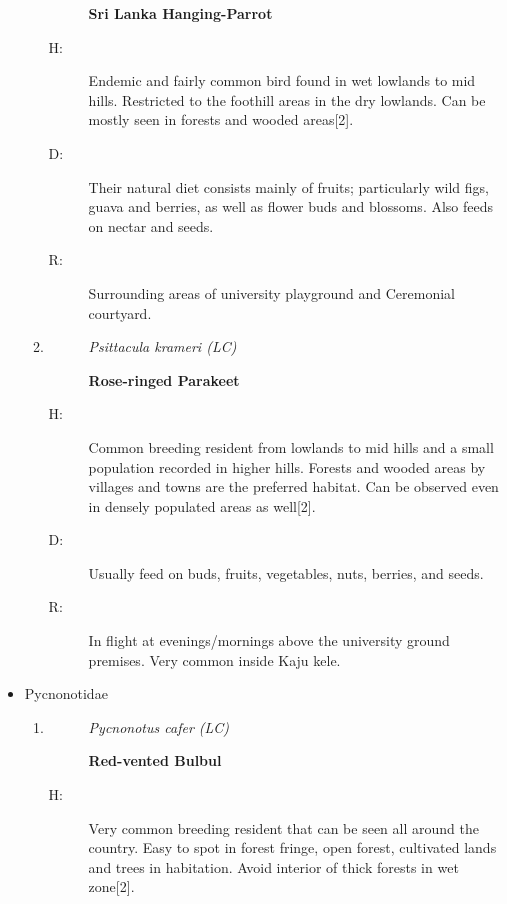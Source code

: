 \begin{itemize}
\begin{enumerate}
\begin{description}
\textbf{Sri Lanka Hanging{-}Parrot}%
\end{description}%
\begin{description}%
\item[H: ]%
Endemic and fairly common bird found in wet lowlands to mid hills. Restricted to the foothill areas in the dry lowlands. Can be mostly seen in forests and wooded areas{[}2{]}.%
\item[D: ]%
Their natural diet consists mainly of fruits; particularly wild figs, guava and berries, as well as flower buds and blossoms. Also feeds on nectar and seeds.%
\item[R: ]%
Surrounding areas of university playground and Ceremonial courtyard.%
\end{description}%
\item%
\begin{description}%
\item[]%
\textit{Psittacula krameri (LC)}%
\item[]%
\textbf{Rose{-}ringed Parakeet}%
\end{description}%
\begin{description}%
\item[H: ]%
Common breeding resident from lowlands to mid hills and a small population recorded in higher hills. Forests and wooded areas by villages and towns are the preferred habitat. Can be observed even in densely populated areas as well{[}2{]}.%
\item[D: ]%
Usually feed on buds, fruits, vegetables, nuts, berries, and seeds.%
\item[R: ]%
In flight at evenings/mornings above the university ground premises. Very common inside Kaju kele.%
\end{description}%
\end{enumerate}%
\item%
Pycnonotidae%
\begin{enumerate}%
\item%
\begin{description}%
\item[]%
\textit{Pycnonotus cafer (LC)}%
\item[]%
\textbf{Red{-}vented Bulbul}%
\end{description}%
\begin{description}%
\item[H: ]%
Very common breeding resident that can be seen all around the country. Easy to spot in forest fringe, open forest, cultivated lands and trees in habitation.  Avoid interior of thick forests in wet zone{[}2{]}.%

\end{description}
\end{enumerate}
\end{itemize}
